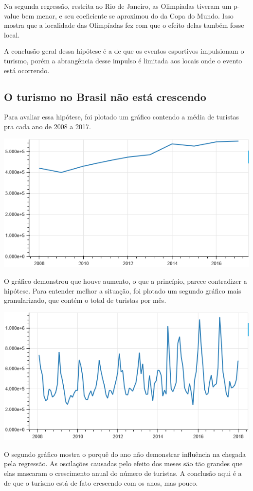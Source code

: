 \documentclass[review]{elsarticle}
\begin{document}
Na segunda regressão, restrita ao Rio de Janeiro, as Olimpíadas tiveram um p-value bem menor, e seu coeficiente se aproximou do da Copa do Mundo. Isso mostra que a localidade das Olimpíadas fez com que o efeito delas também fosse local.

A conclusão geral dessa hipótese é a de que os eventos esportivos impulsionam o turismo, porém a abrangência desse impulso é limitada aos locais onde o evento está ocorrendo.

\subsection{O turismo no Brasil não está crescendo}
Para avaliar essa hipótese, foi plotado um gráfico contendo a média de turistas pra cada ano de 2008 a 2017.

\includegraphics[width=\textwidth]{Segment-Tourist-Year}

O gráfico demonstrou que houve aumento, o que a princípio, parece contradizer a hipótese. Para entender melhor a situação, foi plotado um segundo gráfico mais granularizado, que contém o total de turistas por mês.

\includegraphics[width=\textwidth]{Segment-Tourist-Month}

O segundo gráfico mostra o porquê do ano não demonstrar influência na chegada pela regressão. As oscilações causadas pelo efeito dos meses são tão grandes que elas mascaram o crescimento anual do número de turistas. A conclusão aqui é a de que o turismo está de fato crescendo com os anos, mas pouco.
\end{document}
